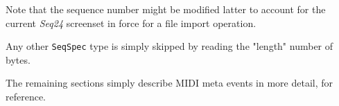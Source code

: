    Note that the sequence number might be modified latter to account for the
   current \textsl{Seq24} screenset in force for a file import operation.

   Any other \texttt{SeqSpec} type is simply skipped by reading the "length"
   number of bytes.

   The remaining sections simply describe MIDI meta events in more detail, for
   reference.

